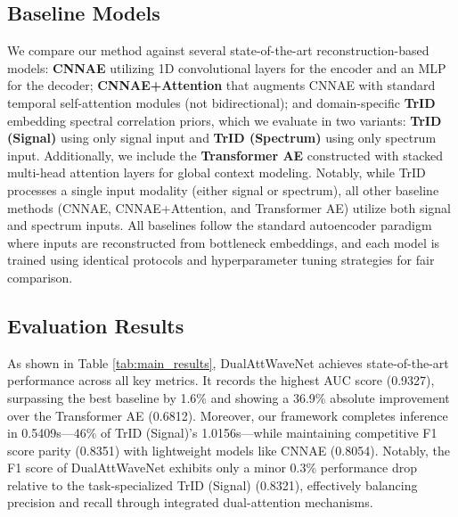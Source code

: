 \documentclass[conference]{IEEEtran}
\begin{document}


\subsection{Baseline Models}

We compare our method against several state-of-the-art reconstruction-based models: \textbf{CNNAE} utilizing 1D convolutional layers for the encoder and an MLP for the decoder; \textbf{CNNAE+Attention} that augments CNNAE with standard temporal self-attention modules (not bidirectional); and domain-specific \textbf{TrID} embedding spectral correlation priors, which we evaluate in two variants: \textbf{TrID (Signal)} using only signal input and \textbf{TrID (Spectrum)} using only spectrum input. Additionally, we include the \textbf{Transformer AE} constructed with stacked multi-head attention layers for global context modeling. Notably, while TrID processes a single input modality (either signal or spectrum), all other baseline methods (CNNAE, CNNAE+Attention, and Transformer AE) utilize both signal and spectrum inputs. All baselines follow the standard autoencoder paradigm where inputs are reconstructed from bottleneck embeddings, and each model is trained using identical protocols and hyperparameter tuning strategies for fair comparison.

\subsection{Evaluation Results}

As shown in Table \ref{tab:main_results}, DualAttWaveNet achieves state-of-the-art performance across all key metrics. It records the highest AUC score (0.9327), surpassing the best baseline by 1.6\% and showing a 36.9\% absolute improvement over the Transformer AE (0.6812). Moreover, our framework completes inference in 0.5409s—46\% of TrID (Signal)'s 1.0156s—while maintaining competitive F1 score parity (0.8351) with lightweight models like CNNAE (0.8054). Notably, the F1 score of DualAttWaveNet exhibits only a minor 0.3\% performance drop relative to the task-specialized TrID (Signal) (0.8321), effectively balancing precision and recall through integrated dual-attention mechanisms.
\end{document}
